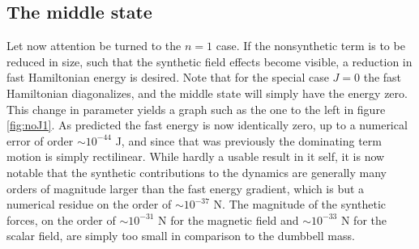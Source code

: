\documentclass[main.tex]{subfiles}
\begin{document}
\subsection{The middle state}\label{sec:resmiddle}
Let now attention be turned to the \(n = 1 \) case. If the nonsynthetic term is to be
reduced in size, such that the synthetic field effects become visible, a reduction in fast
Hamiltonian energy is desired. Note that for the special case \(J = 0\) the fast
Hamiltonian diagonalizes, and the middle state will simply have the energy zero. This
change in parameter yields a graph such as the one to the left in figure \ref{fig:noJ1}. As predicted the fast
energy is now identically zero, up to a numerical error of order \(\sim 10^{-44}\) J, and since that was previously the dominating term motion is
simply rectilinear. While hardly a usable result in it self, it is now notable that the
synthetic contributions to the dynamics are generally many orders of magnitude larger than the
fast energy gradient, which is but a numerical residue on the order of \(\sim 10^{-37}\) N.
The magnitude of the synthetic forces, on the order of \(\sim 10^{-31}\) N for the magnetic
field
and \(\sim 10^{-33}\) N for the scalar field, are simply too small in comparison to the
dumbbell mass.
\end{document}
